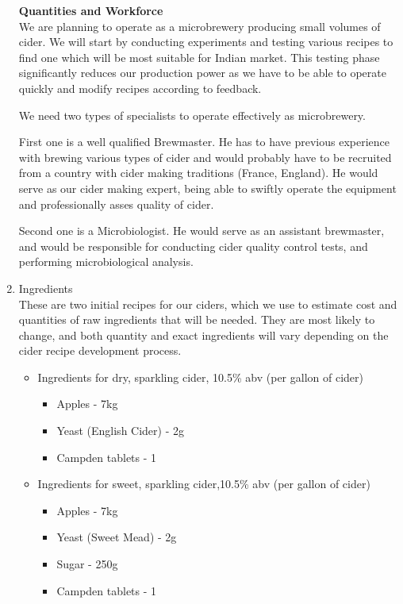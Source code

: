 \documentclass{article}
\begin{document}
\begin{enumerate}
\textbf{Quantities and Workforce} \\
We are planning to operate as a microbrewery producing small volumes of cider.
We will start by conducting experiments and testing various recipes to find one which will be most suitable for Indian market.
This testing phase significantly reduces our production power as we have to be able to operate quickly and modify recipes according to feedback.

We need two types of specialists to operate effectively as microbrewery.

First one is a well qualified Brewmaster.
He has to have previous experience with brewing various types of cider and would probably have to be recruited from a country with cider making traditions (France, England).
He would serve as our cider making expert, being able to swiftly operate the equipment and professionally asses quality of cider.

Second one is a Microbiologist.
He would serve as an assistant brewmaster, and would be responsible for conducting cider quality control tests, and performing microbiological analysis.

	\item Ingredients \\
		These are two initial recipes for our ciders, which we use to estimate cost and quantities of raw ingredients that will be needed.
		They are most likely to change, and both quantity and exact ingredients will vary depending on the cider recipe development process.\\
		\begin{itemize}

			\item Ingredients for dry, sparkling cider, 10.5\% abv (per gallon of cider) \\
				\begin{itemize}
					\item Apples - 7kg \\
					\item Yeast (English Cider) - 2g \\
					\item Campden tablets - 1 \\
				\end{itemize}

			\item Ingredients for sweet, sparkling cider,10.5\% abv (per gallon of cider) \\
				\begin{itemize}
					\item Apples - 7kg \\
					\item Yeast (Sweet Mead) - 2g \\
					\item Sugar - 250g \\
					\item Campden tablets - 1 \\
				\end{itemize}
			\end{itemize}


\end{enumerate}
\end{document}
